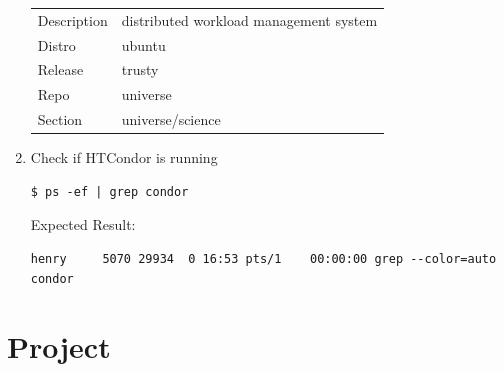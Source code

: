 \documentclass{article}
\begin{document}
\begin{enumerate}
\begin{center}
\begin{tabular}{|l|l|}
Description &	distributed workload management system\\
Distro &	ubuntu\\
Release &	trusty\\
Repo &	universe\\
Section&	universe/science \\ \hline
\end{tabular}
\end{center}
\item Check if HTCondor is running 
\begin{verbatim}
$ ps -ef | grep condor
\end{verbatim}
Expected Result:
\begin{verbatim}
henry     5070 29934  0 16:53 pts/1    00:00:00 grep --color=auto condor
\end{verbatim}
\end{enumerate}

\section{Project}
\end{document}
